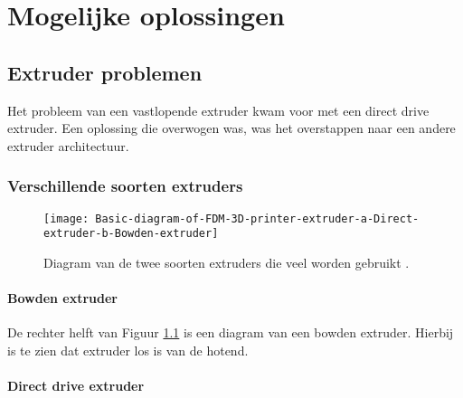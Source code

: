 \chapter{Mogelijke oplossingen}
\label{Mogelijke_oplossingen}

\section{Extruder problemen}

Het probleem van een vastlopende extruder kwam voor met een direct drive
extruder. Een oplossing die overwogen was, was het overstappen naar een andere
extruder architectuur.

\subsection{Verschillende soorten extruders}

\begin{figure}[h]
    \centerline{\texttt{[image: Basic-diagram-of-FDM-3D-printer-extruder-a-Direct-extruder-b-Bowden-extruder]}}
    \caption{Diagram van de twee soorten extruders die veel worden gebruikt \cite{soorten_extruders}.}
    \label{fig:soorten_extruders}
\end{figure}

\subsubsection{Bowden extruder}
\label{ss:Bowden_extruder}

De rechter helft van Figuur \ref{fig:soorten_extruders} \cite{soorten_extruders}
is een diagram van een bowden extruder. Hierbij is te zien dat \ac{extruder} los
is van de \ac{hotend}.


\subsubsection{Direct drive extruder}
\label{ss:direct_drive_extruder}

